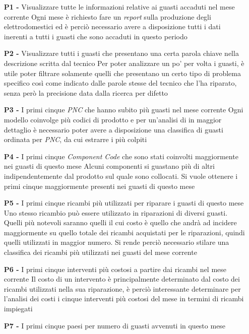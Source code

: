 \documentclass[a4paper, 12pt]{report}
\begin{document}
\begin{itemize}
	\item[\textbf{P1 -}] Visualizzare tutte le informazioni relative ai guasti accaduti nel mese corrente
		\subitem Ogni mese è richiesto fare un \textit{report} sulla produzione degli elettrodomestici ed è perciò necessario avere a disposizione tutti i dati inerenti a
		tutti i guasti che sono accaduti in questo periodo
	\item[\textbf{P2 -}] Visualizzare tutti i guasti che presentano una certa parola chiave nella descrizione scritta dal tecnico
		\subitem Per poter analizzare un po' per volta i guasti, è utile poter filtrare solamente quelli che presentano un certo tipo di problema specifico così come indicato
		dalle parole stesse del tecnico che l'ha riparato, senza però la precisione data dalla ricerca per difetto
	\item[\textbf{P3 -}] I primi cinque \textit{PNC} che hanno subito più guasti nel mese corrente
		\subitem Ogni modello coinvolge più codici di prodotto e per un'analisi di in maggior dettaglio è necessario poter avere a disposizione una classifica
		di guasti ordinata per \textit{PNC}, da cui estrarre i più colpiti
	\item[\textbf{P4 -}] I primi cinque \textit{Component Code} che sono stati coinvolti maggiormente nei guasti di questo mese
		\subitem Alcuni componenti si guastano più di altri indipendentemente dal prodotto sul quale sono collocati. Si vuole ottenere i primi cinque maggiormente presenti nei guasti di questo 
		mese
	\item[\textbf{P5 -}] I primi cinque ricambi più utilizzati per riparare i guasti di questo mese
		\subitem Uno stesso ricambio può essere utilizzato in riparazioni di diversi guasti. Quelli più notevoli saranno quelli il cui costo è quello che andrà ad incidere maggiormente su quello 
		totale dei ricambi acquistati per le riparazioni, quindi quelli utilizzati in maggior numero. Si rende perciò necessario stilare una classifica dei ricambi più utilizzati nei guasti del 
		mese corrente
	\item[\textbf{P6 -}] I primi cinque interventi più costosi a partire dai ricambi nel mese corrente
		\subitem Il costo di un intervento è principalmente determinato dal costo dei ricambi utilizzati nella sua riparazione, è perciò interessante
		determinare per l'analisi dei costi i cinque interventi più costosi del mese in termini di ricambi impiegati
	\item[\textbf{P7 -}] I primi cinque paesi per numero di guasti avvenuti in questo mese

\end{itemize}
\end{document}
